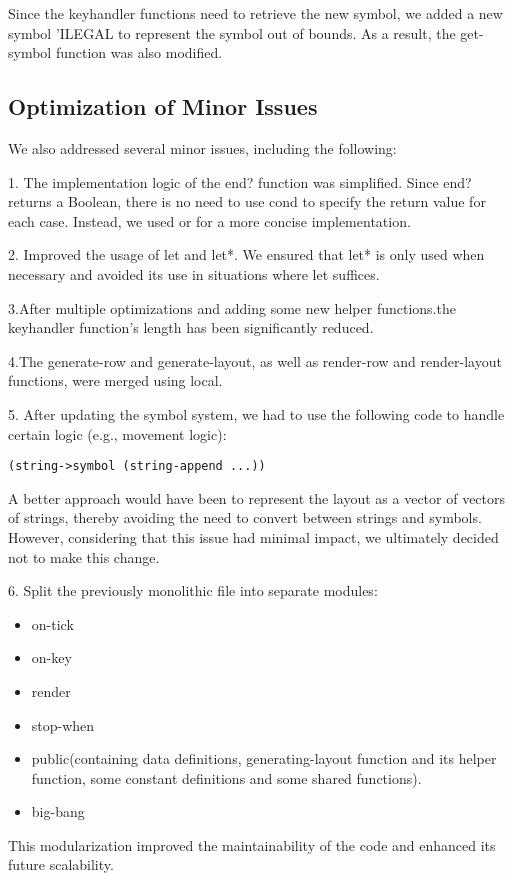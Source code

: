 \documentclass[12pt]{article}
\begin{document}
\indent Since the keyhandler functions need to retrieve the new symbol, we added a new symbol 'ILEGAL to represent the symbol out of bounds. As a result, the get-symbol function was also modified.

\subsection*{Optimization of Minor Issues}
\hspace*{1.27cm}We also addressed several minor issues, including the following:  

1. The implementation logic of the end? function was simplified. Since end? returns a Boolean, there is no need to use cond to specify the return value for each case. Instead, we used or for a more concise implementation.

2. Improved the usage of let and let*. We ensured that let* is only used when necessary and avoided its use in situations where let suffices.

3.After multiple optimizations and adding some new helper functions.the keyhandler function's length has been significantly reduced.

4.The generate-row and generate-layout, as well as render-row and render-layout functions, were merged using local.

5. After updating the symbol system, we had to use the following code to handle certain logic (e.g., movement logic):  
\begin{lstlisting}
(string->symbol (string-append ...))
\end{lstlisting}

\indent A better approach would have been to represent the layout as a vector of vectors of strings, thereby avoiding the need to convert between strings and symbols. However, considering that this issue had minimal impact, we ultimately decided not to make this change.

6. Split the previously monolithic file into separate modules:
\begin{itemize}
  \item on-tick
  \item on-key
  \item render
  \item stop-when
  \item public(containing data definitions, generating-layout function and its helper function, some constant definitions and some shared functions).
  \item big-bang
\end{itemize}

\indent This modularization improved the maintainability of the code and enhanced its future scalability.
\end{document}
